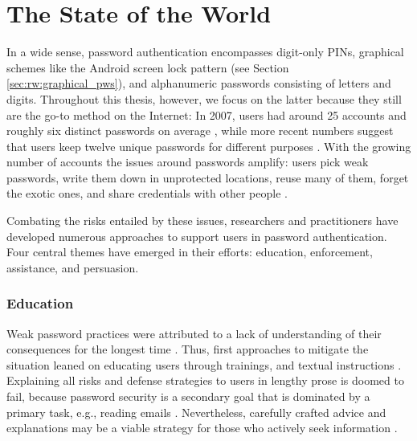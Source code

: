 \section{The State of the World}
In a wide sense, password authentication encompasses digit-only \glspl{PIN}, graphical schemes like the Android screen lock pattern (see Section \ref{sec:rw:graphical_pws}), and alphanumeric passwords consisting of letters and digits. Throughout this thesis, however, we focus on the latter because they still are the go-to method on the Internet: In 2007, users had around 25 accounts and roughly six distinct passwords on average \cite{Florencio2007LargeScaleStudyPasswordHabits}, while more recent numbers suggest that users keep twelve unique passwords for different purposes \cite{Wash2016UnderstandingPasswordChoices}. With the growing number of accounts the issues around passwords amplify: users pick weak passwords, write them down in unprotected locations, reuse many of them, forget the exotic ones, and share credentials with other people \cite{Stobert2014PasswordLifeCycle}.  

Combating the risks entailed by these issues, researchers and practitioners have developed numerous approaches to support users in password authentication. Four central themes have emerged in their efforts: education, enforcement, assistance, and persuasion. 

\subsubsection{Education}
Weak password practices were attributed to a lack of understanding of their consequences for the longest time \cite{Sasse2001WeakestLink}. Thus, first approaches to mitigate the situation leaned on educating users through trainings, and textual instructions \cite{Herley2009SoLongThanksExternalities}. Explaining all risks and defense strategies to users in lengthy prose is doomed to fail, because password security is a secondary goal that is dominated by a primary task, e.g., reading emails \cite{Whitten1999WhyJohnnyCantEncrypt}. Nevertheless, carefully crafted advice and explanations may be a viable strategy for those who actively seek information \cite{Sasse2005UsableSecurityPosition, Ur2017DataDrivenPWMeter}. 

